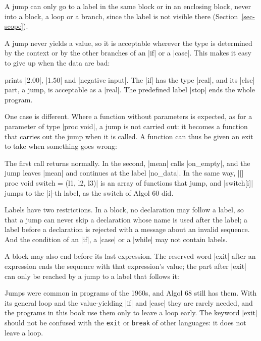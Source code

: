 
A jump can only go to a label in the same block or in an enclosing
block, never into a block, a loop or a branch, since the label is not
visible there (Section~\ref{sec-scope}).

A jump never yields a value, so it is acceptable wherever the type is
determined by the context or by the other branches of an \code|if| or a
\code|case|. This makes it easy to give up when the data are bad:


\noindent prints \code|2.00|, \code|1.50| and \code|negative input|. The
\code|if| has the type \code|real|, and its \code|else| part, a jump, is
acceptable as a \code|real|. The predefined label \code|stop| ends the
whole program.

One case is different. Where a function without parameters is expected,
as for a parameter of type \code|proc void|, a jump is not carried out:
it becomes a function that carries out the jump when it is called. A
function can thus be given an exit to take when something goes wrong:


\noindent The first call returns normally. In the second, \code|mean|
calls \code|on_empty|, and the jump leaves \code|mean| and continues at
the label \code|no_data|. In the same way,
\code|[] proc void switch = (l1, l2, l3)| is an array of functions that jump, and
\code|switch[i]| jumps to the \code|i|-th label, as the switch of Algol
60 did.

Labels have two restrictions. In a block, no declaration may follow a
label, so that a jump can never skip a declaration whose name is used
after the label; a label before a declaration is rejected with a message
about an invalid sequence. And the condition of an \code|if|, a
\code|case| or a \code|while| may not contain labels.

A block may also end before its last expression. The reserved word
\code|exit| after an expression ends the sequence with that expression's
value; the part after \code|exit| can only be reached by a jump to a label
that follows it:


Jumps were common in programs of the 1960s, and Algol 68 still has them.
With its general loop and the value-yielding \code|if| and \code|case|
they are rarely needed, and the programs in this book use them only to
leave a loop early. The keyword \code|exit| should not be confused with
the \texttt{exit} or \texttt{break} of other languages: it does not leave
a loop.

